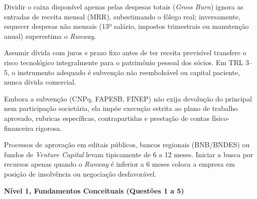 
\begin{boxErro}
  Dividir o caixa disponível apenas pelas despesas totais (\textit{Gross Burn}) ignora as entradas de receita mensal (MRR), subestimando o fôlego real; inversamente, esquecer despesas não mensais (13º salário, impostos trimestrais ou manutenção anual) superestima o \textit{Runway}.
\end{boxErro}

\begin{boxErro}
  Assumir dívida com juros e prazo fixo antes de ter receita previsível transfere o risco tecnológico integralmente para o patrimônio pessoal dos sócios. Em TRL 3–5, o instrumento adequado é subvenção não reembolsável ou capital paciente, nunca dívida comercial.
\end{boxErro}

\begin{boxErro}
  Embora a subvenção (CNPq, FAPESB, FINEP) não exija devolução do principal nem participação societária, ela impõe execução estrita ao plano de trabalho aprovado, rubricas específicas, contrapartidas e prestação de contas físico-financeira rigorosa.
\end{boxErro}

\begin{boxErro}
  Processos de aprovação em editais públicos, bancos regionais (BNB/BNDES) ou fundos de \textit{Venture Capital} levam tipicamente de 6 a 12 meses. Iniciar a busca por recursos apenas quando o \textit{Runway} é inferior a 6 meses coloca a empresa em posição de insolvência ou negociação desfavorável.
\end{boxErro}


\textbf{Nível 1, Fundamentos Conceituais (Questões 1 a 5)}

